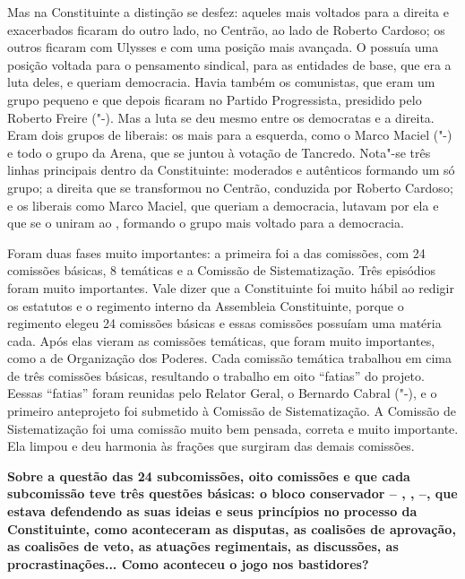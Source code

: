 Mas na Constituinte a distinção se desfez: aqueles mais voltados para a
direita e exacerbados ficaram do outro lado, no Centrão, ao lado de
Roberto Cardoso; os outros ficaram com Ulysses e com uma posição mais
avançada. O  possuía uma posição voltada para o pensamento sindical,
para as entidades de base, que era a luta deles, e queriam democracia.
Havia também os comunistas, que eram um grupo pequeno e que depois
ficaram no Partido Progressista, presidido pelo Roberto Freire ("-).
Mas a luta se deu mesmo entre os democratas e a direita. Eram dois
grupos de liberais: os mais para a esquerda, como o Marco Maciel
("-) e todo o grupo da Arena, que se juntou à votação de Tancredo.
Nota"-se três linhas principais dentro da Constituinte: moderados e
autênticos formando um só grupo; a direita que se transformou no
Centrão, conduzida por Roberto Cardoso; e os liberais como Marco Maciel,
que queriam a democracia, lutavam por ela e que se o uniram ao ,
formando o grupo mais voltado para a democracia.

Foram duas fases muito importantes: a primeira foi a das comissões, com
24 comissões básicas, 8 temáticas e a Comissão de Sistematização. Três
episódios foram muito importantes. Vale dizer que a Constituinte foi
muito hábil ao redigir os estatutos e o regimento interno da Assembleia
Constituinte, porque o regimento elegeu 24 comissões básicas e essas
comissões possuíam uma matéria cada. Após elas vieram as comissões
temáticas, que foram muito importantes, como a de Organização dos
Poderes. Cada comissão temática trabalhou em cima de três comissões
básicas, resultando o trabalho em oito ``fatias'' do projeto. Eessas
``fatias'' foram reunidas pelo Relator Geral, o Bernardo Cabral
("-), e o primeiro anteprojeto foi submetido à Comissão de
Sistematização. A Comissão de Sistematização foi uma comissão muito bem
pensada, correta e muito importante. Ela limpou e deu harmonia às
frações que surgiram das demais comissões.

\textbf{Sobre a questão das 24 subcomissões, oito comissões e que cada
subcomissão teve três questões básicas: o bloco conservador -- , ,
 --, que estava defendendo as suas ideias e seus princípios no
processo da Constituinte, como aconteceram as disputas, as coalisões de
aprovação, as coalisões de veto, as atuações regimentais, as discussões,
as procrastinações... Como aconteceu o jogo nos bastidores?}

